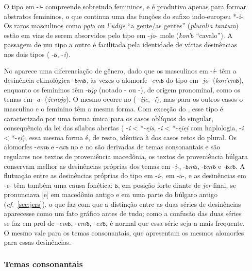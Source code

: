 

O tipo em -\emph{i}- compreende sobretudo femininos, e é produtivo
apenas para formar abstratos femininos, o que continua uma das funções
do sufixo indo-europeu *-\emph{i}-. Os raros masculinos como \emph{pǫtь}
ou \emph{l'udije} ``a gente/as gentes'' (\emph{pluralia tantum}) estão
em vias de serem absorvidos pelo tipo em -\emph{jo}- mole (\emph{kon'ь}
``cavalo''). A passagem de um tipo a outro é facilitada pela identidade
de várias desinências nos dois tipos ( -\emph{ь}, 
-\emph{i}).

No  aparece uma diferenciação de gênero, dado que os masculinos
em -\emph{i}- têm a desinência etimológica -\emph{ьmь}, às vezes o
alomorfe -\emph{emь} do tipo em -\emph{jo}- (\emph{kon'emь}), enquanto
os femininos têm -\emph{ьjǫ} (notado - ou -), de
origem pronominal,
como os temas em -\emph{a}- (\emph{ženojǫ}). O mesmo ocorre no 
( \emph{-ije},  -\emph{i}), mas para os outros casos o
masculino e o feminino têm a mesma forma. Com exceção do , esse
tipo é caracterizado por uma forma única para os casos oblíquos do
singular, consequência da lei das sílabas abertas ( -\emph{i}
< *-\emph{ei̯s},  -\emph{i} < *-\emph{ei̯ei̯} com
haplologia,  -\emph{i} < *-\emph{ēi̯}); essa mesma forma
é, de resto, idêntica à dos casos retos do plural. Os alomorfes
-\emph{emъ} e -\emph{exъ} no  e no  são derivadas de temas
consonantais e são regulares nos textos de proveniência macedônia, os
textos de proveniência búlgara conservam melhor as desinências próprias
dos temas em -\emph{i­­}-, -\emph{ьmь}, -\emph{ьmъ} e \emph{-ьxъ}. A
flutuação entre as desinências próprias do tipo em -\emph{i}-, em
-\emph{ь}-, e as desinências em -\emph{e}- têm também uma causa
fonética: \emph{ь}, em posição forte diante de \emph{jer} final, se
pronunciava [e] em macedônio antigo e em uma parte do búlgaro antigo
(\emph{cf.}~\ref{sec:jers}), o que faz com que a distinção entre as duas séries de
desinências aparecesse como um fato gráfico antes de tudo; como a
confusão das duas séries se faz em prol de \emph{-emь}, -\emph{emъ},
-\emph{exъ}, é normal que essa série seja a mais frequente. O mesmo vale
para os temas consonantais, que apresentam os mesmos alomorfes para
essas desinências.



\subsubsection{Temas consonantais}

